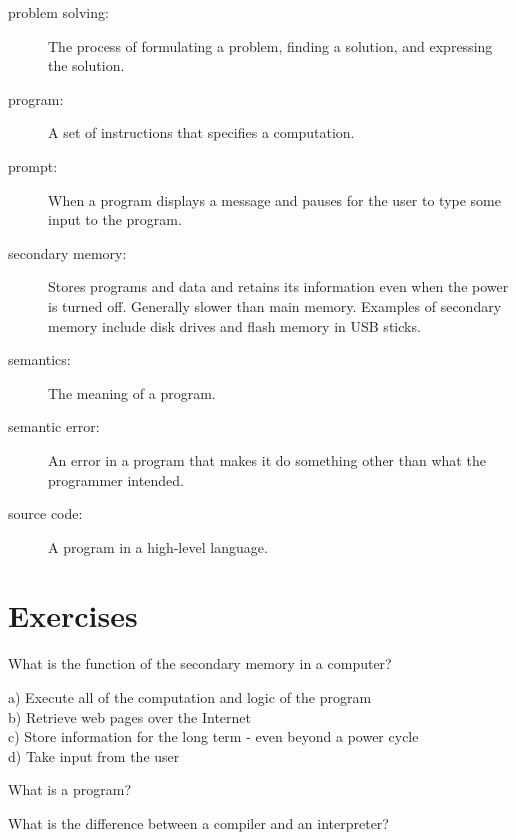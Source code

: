 \begin{description}
\item[problem solving:]  The process of formulating a problem, finding
a solution, and expressing the solution.

\item[program:] A set of instructions that specifies a computation.

\item[prompt:] When a program displays a message and pauses for the 
user to type some input to the program.

\item[secondary memory:] Stores programs and data and retains its 
information even when the power is turned off.  Generally slower 
than main memory.  Examples of secondary memory include disk 
drives and flash memory in USB sticks.

\item[semantics:]  The meaning of a program.

\item[semantic error:]   An error in a program that makes it do something
other than what the programmer intended.

\item[source code:]  A program in a high-level language.

\end{description}

\section{Exercises}


\begin{ex}
What is the function of the secondary memory in a computer?

a) Execute all of the computation and logic of the program\\
b) Retrieve web pages over the Internet\\
c) Store information for the long term - even beyond a power cycle\\
d) Take input from the user 
\end{ex}

\begin{ex}
What is a program?
\end{ex}

\begin{ex}
What is the difference between a compiler and an interpreter?
\end{ex}

